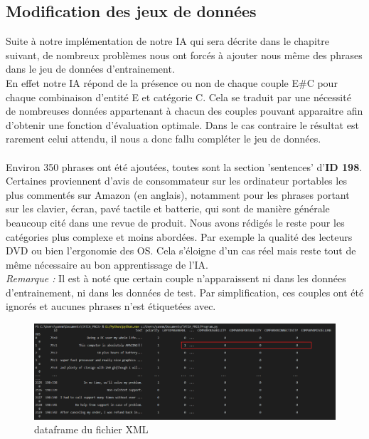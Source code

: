 \documentclass[12pt ,a4paper ]{article}
\begin{document}
\begin{multicols}{2}
\subsection{Modification des jeux de données}
Suite à notre implémentation de notre IA qui sera décrite dans le chapitre suivant, de nombreux problèmes nous ont forcés à ajouter nous même des phrases dans le jeu de données d'entrainement.\\

En effet notre IA répond de la présence ou non de chaque couple E\#C pour chaque combinaison d'entité E et catégorie C. Cela se traduit par une nécessité de nombreuses données appartenant à chacun des couples pouvant apparaitre afin d'obtenir une fonction d'évaluation optimale. Dans le cas contraire le résultat est rarement celui attendu, il nous a donc fallu compléter le jeu de données.

\paragraph{}
Environ 350 phrases ont été ajoutées, toutes sont la section 'sentences' d'\textbf{ID 198}. Certaines proviennent d'avis de consommateur sur les ordinateur portables les plus commentés sur Amazon (en anglais), notamment pour les phrases portant sur les clavier, écran, pavé tactile et batterie, qui sont de manière générale beaucoup cité dans une revue de produit. Nous avons rédigés le reste pour les catégories plus complexe et moins abordées. Par exemple la qualité des lecteurs DVD ou bien l'ergonomie des OS. Cela s'éloigne d'un cas réel mais reste tout de même nécessaire au bon apprentissage de l'IA. \\ 

\noindent \textit{Remarque : } Il est à noté que certain couple n'apparaissent ni dans les données d'entrainement, ni dans les données de test. Par simplification, ces couples ont été ignorés et aucunes phrases n'est étiquetées avec.

\begin{figure}[th]
    \begin{center}
        \includegraphics[width=1\textwidth]{first_dataf.png}
    \end{center}
\caption{\small{dataframe du fichier XML}}
\end{figure}
\newpage

\end{multicols}
\end{document}
